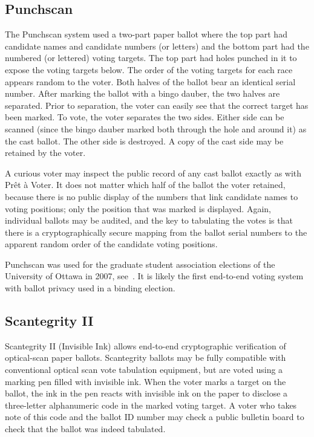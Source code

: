 \subsection{Punchscan~\cite{popoveniuc2006,popoveniuc2010punchscan}}

The Punchscan system used a two-part paper ballot where the top part had
candidate names and candidate numbers (or letters) and the bottom part had
the numbered (or lettered) voting targets.  The top part had holes punched
in it to expose the voting targets below.  The order of the voting targets
for each race appears random to the voter.  Both halves of the ballot bear
an identical serial number.  After marking the ballot with a bingo dauber,
the two halves are separated.  Prior to separation, the voter can easily see
that the correct target has been marked.  To vote, the voter separates the
two sides.  Either side can be scanned (since the bingo dauber marked both
through the hole and around it) as the cast ballot. The other side is
destroyed. A copy of the cast side may be retained by the voter.

A curious voter may inspect the public record of any cast ballot exactly as
with Prêt à Voter. It does not matter which half of the ballot the voter
retained, because there is no public display of the numbers that link
candidate names to voting positions; only the position that was marked is
displayed.  Again, individual ballots may be audited, and the key to
tabulating the votes is that there is a cryptographically secure mapping
from the ballot serial numbers to the apparent random order of the candidate
voting positions.

Punchscan was used for the graduate student association elections of the
University of Ottawa in 2007, see~\cite{essex2007}. It is likely the first
end-to-end voting system with ballot privacy used in a binding election.

\subsection{Scantegrity II~\cite{chaum2008,chaum2009}}

Scantegrity II (Invisible Ink) allows end-to-end cryptographic verification
of optical-scan paper ballots.  Scantegrity ballots may be fully compatible
with conventional optical scan vote tabulation equipment, but are voted
using a marking pen filled with invisible ink.  When the voter marks a
target on the ballot, the ink in the pen reacts with invisible ink on the
paper to disclose a three-letter alphanumeric code in the marked voting
target.  A voter who takes note of this code and the ballot ID number may
check a public bulletin board to check that the ballot was indeed tabulated.

